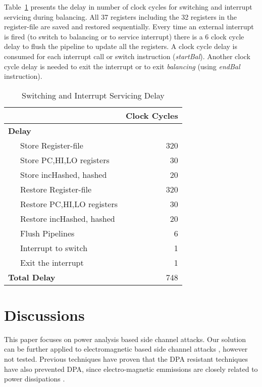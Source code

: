 \documentclass{article}
\begin{document}
Table~\ref{intrdelay} presents    the delay in number of clock cycles
for   switching   and    interrupt servicing during balancing. All 37
registers including the 32   registers in the register-file are saved
and restored sequentially. Every time  an external interrupt is fired
(to switch to balancing or to service interrupt) there  is  a 6 clock
cycle  delay  to  flush  the pipeline to update all the  registers. A
clock  cycle  delay  is    consumed for each interrupt call or switch
instruction (\emph{startBal}). Another clock cycle delay is needed to
exit the interrupt or to   exit \emph{balancing} (using \emph{endBal}
instruction).

\begin{table}[ht!]
\centering
\caption{Switching and Interrupt Servicing Delay} \label{intrdelay}
\begin{tabular}[t]{|l|r|}\hline
           & \multicolumn{1}{|c|}{\bf Clock Cycles} \\\hline\hline
{\bf Delay}                    &      \\
~~~Store Register-file         &  320 \\
~~~Store PC,HI,LO registers    &   30 \\
~~~Store incHashed, hashed     &   20 \\
~~~Restore Register-file       &  320 \\
~~~Restore PC,HI,LO registers  &   30 \\
~~~Restore incHashed, hashed   &   20 \\
~~~Flush Pipelines             &    6 \\
~~~Interrupt to switch         &    1 \\
~~~Exit the interrupt          &    1 \\\hline
{\bf Total Delay}              &  748 \\\hline\hline
\end{tabular}
\end{table}



\section{Discussions} \label{discussions}
This paper focuses on power analysis based side channel attacks. Our solution can be further applied 
to electromagnetic based side channel attacks \cite{homma10electro}, however not tested. 
Previous techniques have proven that the DPA resistant techniques have also prevented DPA, since
electro-magnetic emmissions are closely related to power dissipations \cite{gebotys06masking, gebotys07phasesub}.
 
\end{document}
